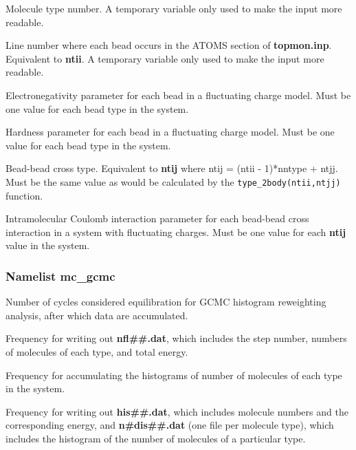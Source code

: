 \documentclass[12pt,letterpaper]{article}
\begin{document}
 Molecule type number. A temporary variable only used to 
make the input more readable.

 Line number where each bead occurs in the ATOMS section 
of {\bf topmon.inp}. Equivalent to {\bf ntii}.
A temporary variable only used to make the input more readable.

 Electronegativity parameter for each bead in a fluctuating charge
model. Must be one value for each bead type in the system.

 Hardness parameter for each bead in a fluctuating charge
model. Must be one value for each bead type in the system.

 Bead-bead cross type. Equivalent to {\bf ntij} where
ntij = (ntii - 1)*nntype + ntjj. Must be the same value as would be calculated by the
{\tt type\_2body(ntii,ntjj)} function. 

 Intramolecular Coulomb interaction parameter for each 
bead-bead cross interaction in a system with fluctuating charges. 
Must be one value for each {\bf ntij} value in the system.

\subsubsection{Namelist \textbf{mc\_gcmc}}
 Number of cycles considered
equilibration for GCMC histogram reweighting analysis, after
which data are accumulated.

 Frequency for writing out {\bf
  nfl\#\#.dat}, which includes the step number, numbers of
molecules of each type, and total energy.

 Frequency for accumulating the
histograms of number of molecules of each type in the
system.

 Frequency for writing out {\bf
  his\#\#.dat}, which includes molecule numbers and the
corresponding energy, and {\bf n\#dis\#\#.dat} (one file per
molecule type), which includes the histogram of the number
of molecules of a particular type.
\end{document}
